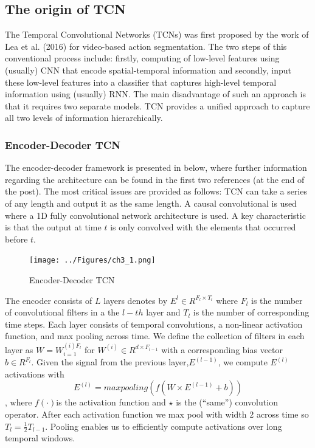 \subsection{The origin of TCN}
The Temporal Convolutional Networks (TCNs) was first proposed by the work of Lea et al. (2016) for video-based action segmentation. The two steps of this conventional process include: firstly, computing of low-level features using (usually) CNN that encode spatial-temporal information and secondly, input these low-level features into a classifier that captures high-level temporal information using (usually) RNN. The main disadvantage of such an approach is that it requires two separate models. TCN provides a unified approach to capture all two levels of information hierarchically.

\subsubsection{Encoder-Decoder TCN} The encoder-decoder framework is presented in below, where further information regarding the architecture can be found in the first two references (at the end of the post). The most critical issues are provided as follows: TCN can take a series of any length and output it as the same length. A causal convolutional is used where a 1D fully convolutional network architecture is used. A key characteristic is that the output at time $t$ is only convolved with the elements that occurred before $t$. 
\begin{figure}[H]
    \texttt{[image: ../Figures/ch3\_1.png]}
    \caption{Encoder-Decoder TCN}
\end{figure}
The encoder consists of $L$ layers denotes by $E^l \in R^{F_l\times T_l}$ where $F_l$ is the number of convolutional filters in a the $l-th$ layer and $T_l$ is the number of corresponding time steps. Each layer consists of temporal convolutions, a non-linear activation function, and max pooling across time. We define the collection of filters in each layer as $W=W^{(i)F_l}_{i=1}$ for $W^{(i)} \in R ^{d \times F_{l-1}}$ with a corresponding bias vector $b \in R^{F_l}$. Given the signal from the previous layer,$E^{(l-1)}$, we compute $E^{(l)}$activations  with $$E^{(l)} = max pooling(f(W \times E^{(l-1)} + b ))$$, where $f(\cdot)$is the activation function and $\star$ is the (“same”) convolution operator. After each activation function we max pool with width 2 across time so $T_l = \frac{1}{2}T_{l-1}$. Pooling enables us to efficiently compute activations over long temporal windows.

